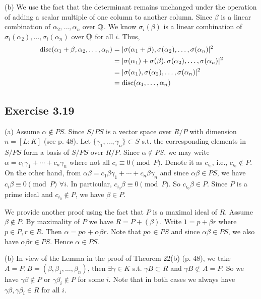 \documentclass[../Marcus.tex]{subfiles}
\begin{document}
(b) We use the fact that the determinant remains unchanged under the operation of adding a scalar multiple of one column to another column. Since $\beta$ is a linear combination of $\alpha_2,\ldots,\alpha_n$ over $\mathbb{Q}$. We know $\sigma_i(\beta)$ is a linear combination of $\sigma_i(\alpha_2),\ldots,\sigma_i(\alpha_n)$ over $\mathbb{Q}$ for all $i$. Thus,
\begin{align*}
    \operatorname{disc}(\alpha_1+\beta,\alpha_2,\ldots,\alpha_n) &= |\sigma(\alpha_1+\beta),\sigma(\alpha_2),\ldots,\sigma(\alpha_n)|^2 \\
    &=|\sigma(\alpha_1)+\sigma(\beta),\sigma(\alpha_2),\ldots,\sigma(\alpha_n)|^2  \\
    &= |\sigma(\alpha_1),\sigma(\alpha_2),\ldots,\sigma(\alpha_n)|^2 \\
    &= \operatorname{disc}(\alpha_1,\ldots,\alpha_n)
\end{align*}

\subsection*{Exercise 3.19}

(a) Assume $\alpha\notin PS$. Since $S/PS$ is a vector space over $R/P$ with dimension $n=[L:K]$ (see p. 48). Let $\{\gamma_1,\ldots,\gamma_n\}\subset S$ s.t. the corresponding elements in $S/PS$ form a basis of $S/PS$ over $R/P$. Since $\alpha\notin PS$, we may write $\alpha=c_1\gamma_1+\cdots+c_n\gamma_n$ where not all $c_i \equiv 0 \pmod{P}$. Denote it as $c_{i_0}$, i.e., $c_{i_0}\notin P$. On the other hand, from $\alpha\beta=c_1\beta\gamma_1+\cdots+c_n\beta\gamma_n$ and since $\alpha\beta\in PS$, we have $c_i\beta \equiv 0 \pmod{P}$ $\forall i$. In particular, $c_{i_0}\beta\equiv 0 \pmod{P}$. So $c_{i_0}\beta\in P$. Since $P$ is a prime ideal and $c_{i_0}\notin P$, we have $\beta\in P$.

We provide another proof using the fact that $P$ is a maximal ideal of $R$. Assume $\beta\notin P$. By maximality of $P$ we have $R=P+(\beta)$. Write $1=p+\beta r$ where $p\in P,r\in R$. Then $\alpha=p \alpha+\alpha\beta r$. Note that $p\alpha\in PS$ and since $\alpha\beta\in PS$, we also have $\alpha\beta r\in PS$. Hence $\alpha\in PS$.

(b) In view of the Lemma in the proof of Theorem 22(b) (p. 48), we take $A=P,B=(\beta,\beta_1,\ldots,\beta_n)$, then $\exists\gamma\in K$ s.t. $\gamma B\subset R$ and $\gamma B \not\subset A=P$. So we have $\gamma\beta\notin P$ or $\gamma\beta_i\notin P$ for some $i$. Note that in both cases we always have $\gamma\beta,\gamma\beta_i \in R$ for all $i$.
\end{document}
